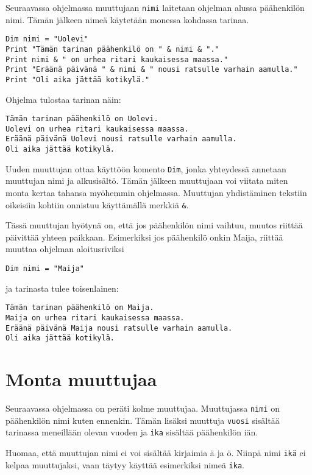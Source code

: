 \documentclass[oneside,11pt,a4paper,finnish]{book}
\begin{document}
Seuraavassa ohjelmassa muuttujaan \texttt{nimi}
laitetaan ohjelman alussa päähenkilön nimi.
Tämän jälkeen nimeä käytetään monessa kohdassa tarinaa.

\begin{verbatim}
Dim nimi = "Uolevi"
Print "Tämän tarinan päähenkilö on " & nimi & "."
Print nimi & " on urhea ritari kaukaisessa maassa."
Print "Eräänä päivänä " & nimi & " nousi ratsulle varhain aamulla."
Print "Oli aika jättää kotikylä."
\end{verbatim}

Ohjelma tulostaa tarinan näin:

\begin{verbatim}
Tämän tarinan päähenkilö on Uolevi.
Uolevi on urhea ritari kaukaisessa maassa.
Eräänä päivänä Uolevi nousi ratsulle varhain aamulla.
Oli aika jättää kotikylä.
\end{verbatim}

Uuden muuttujan ottaa käyttöön komento \texttt{Dim},
jonka yhteydessä annetaan muuttujan nimi ja alkusisältö.
Tämän jälkeen muuttujaan voi viitata miten monta
kertaa tahansa myöhemmin ohjelmassa.
Muuttujan yhdistäminen tekstiin oikeisiin
kohtiin onnistuu käyttämällä merkkiä \texttt{\&}.

Tässä muuttujan hyötynä on,
että jos päähenkilön nimi vaihtuu,
muutos riittää päivittää yhteen paikkaan.
Esimerkiksi jos päähenkilö onkin Maija,
riittää muuttaa ohjelman aloitusriviksi

\begin{verbatim}
Dim nimi = "Maija"
\end{verbatim}

ja tarinasta tulee toisenlainen:

\begin{verbatim}
Tämän tarinan päähenkilö on Maija.
Maija on urhea ritari kaukaisessa maassa.
Eräänä päivänä Maija nousi ratsulle varhain aamulla.
Oli aika jättää kotikylä.
\end{verbatim}

\section{Monta muuttujaa}

Seuraavassa ohjelmassa on peräti kolme muuttujaa.
Muuttujassa \texttt{nimi} on päähenkilön nimi kuten ennenkin.
Tämän lisäksi muuttuja
\texttt{vuosi} sisältää tarinassa meneillään olevan vuoden
ja \texttt{ika} sisältää päähenkilön iän.

Huomaa, että muuttujan nimi ei voi sisältää kirjaimia
ä ja ö.
Niinpä nimi \texttt{ikä} ei kelpaa muuttujaksi,
vaan täytyy käyttää esimerkiksi nimeä \texttt{ika}.
\end{document}
